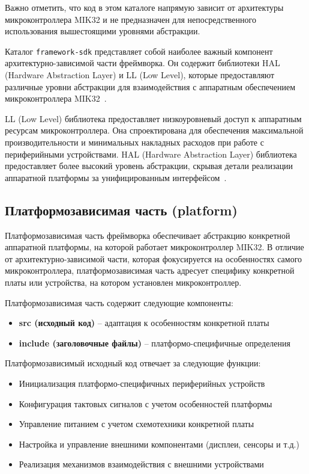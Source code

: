 Важно отметить, что код в этом каталоге напрямую зависит от архитектуры микроконтроллера MIK32 и не предназначен для непосредственного использования вышестоящими уровнями абстракции.

Каталог \texttt{framework-sdk} представляет собой наиболее важный компонент архитектурно-зависимой части фреймворка. Он содержит библиотеки HAL (Hardware Abstraction Layer) и LL (Low Level), которые предоставляют различные уровни абстракции для взаимодействия с аппаратным обеспечением микроконтроллера MIK32~\cite{stm32_hal_ll_comparison}.

LL (Low Level) библиотека предоставляет низкоуровневый доступ к аппаратным ресурсам микроконтроллера. Она спроектирована для обеспечения максимальной производительности и минимальных накладных расходов при работе с периферийными устройствами. HAL (Hardware Abstraction Layer) библиотека предоставляет более высокий уровень абстракции, скрывая детали реализации аппаратной платформы за унифицированным интерфейсом~\cite{stm32_hal_ll_comparison}.

\subsection{Платформозависимая часть (platform)}

Платформозависимая часть фреймворка обеспечивает абстракцию конкретной аппаратной платформы, на которой работает микроконтроллер MIK32. В отличие от архитектурно-зависимой части, которая фокусируется на особенностях самого микроконтроллера, платформозависимая часть адресует специфику конкретной платы или устройства, на котором установлен микроконтроллер.

Платформозависимая часть содержит следующие компоненты:

\begin{itemize}
	\item \textbf{src (исходный код)} -- адаптация к особенностям конкретной платы
	\item \textbf{include (заголовочные файлы)} -- платформо-специфичные определения
\end{itemize}

Платформозависимый исходный код отвечает за следующие функции:

\begin{itemize}
	\item Инициализация платформо-специфичных периферийных устройств
	\item Конфигурация тактовых сигналов с учетом особенностей платформы
	\item Управление питанием с учетом схемотехники конкретной платы
	\item Настройка и управление внешними компонентами (дисплеи, сенсоры и т.д.)
	\item Реализация механизмов взаимодействия с внешними устройствами
\end{itemize}

